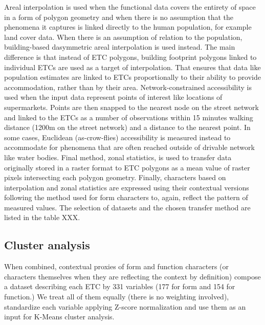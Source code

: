Areal interpolation is used when the functional data covers the entirety of space in a
form of polygon geometry and when there is no assumption that the phenomena it captures
is linked directly to the human population, for example land cover data. When there is
an assumption of relation to the population, building-based dasymmetric areal
interpolation is used instead. The main difference is that instead of ETC polygons,
building footprint polygons linked to individual ETCs are used as a target of
interpolation. That ensures that data like population estimates are linked to ETCs
proportionally to their ability to provide accommodation, rather than by their area.
Network-constrained accessibility is used when the input data represent points of
interest like locations of supermarkets. Points are then snapped to the nearest node on
the street network and linked to the ETCs as a number of observations within 15 minutes
walking distance (1200m on the street network) and a distance to the nearest point. In
some cases, Euclidean (as-crow-flies) accessibility is measured instead to accommodate
for phenomena that are often reached outside of drivable network like water bodies.
Final method, zonal statistics, is used to transfer data originally stored in a raster
format to ETC polygons as a mean value of raster pixels intersecting each polygon
geometry. Finally, characters based on interpolation and zonal statistics are expressed
using their contextual versions following the method used for form characters to, again,
reflect the pattern of measured values. The selection of datasets and the chosen
transfer method are listed in the table XXX.

\subsection*{Cluster analysis}



When combined, contextual proxies of form and function characters (or characters
themselves when they are reflecting the context by definition) compose a dataset
describing each ETC by 331 variables (177 for form and 154 for function.) We treat all
of them equally (there is no weighting involved), standardize each variable applying
Z-score normalization and use them as an input for K-Means cluster analysis.

